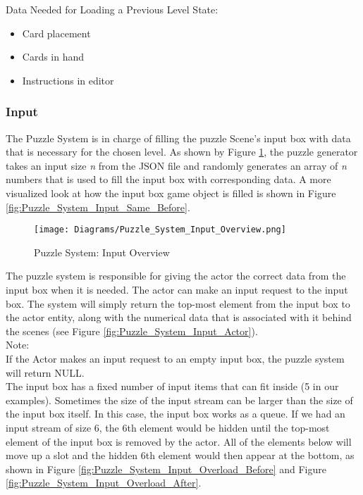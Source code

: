 Data Needed for Loading a Previous Level State:
\begin{itemize}
  \item Card placement
  \item Cards in hand
  \item Instructions in editor
\end{itemize}

\subsubsection{Input}
The Puzzle System is in charge of filling the puzzle Scene's input box with data
that is necessary for the chosen level. As shown by Figure \ref{fig:Puzzle_System_Input_Overview}, 
the puzzle generator takes an input size \textit{n} from the JSON file and randomly generates an array of 
\textit{n} numbers that is used to fill the input box with corresponding data. A more visualized
look at how the input box game object is filled is shown in Figure \ref{fig:Puzzle_System_Input_Same_Before}.\\

\begin{figure}[!hb]
  \caption{Puzzle System: Input Overview}
  \label{fig:Puzzle_System_Input_Overview}
  \centering
  \texttt{[image: Diagrams/Puzzle\_System\_Input\_Overview.png]}
\end{figure}

The puzzle system is responsible for giving the actor the correct data from the
input box when it is needed. The actor can make an input request to the input box.
The system will simply return the top-most element from the input box to the actor entity, along with the
numerical data that is associated with it behind the scenes (see Figure \ref{fig:Puzzle_System_Input_Actor}).\\

Note:\\

If the Actor makes an input request to an empty input box, the puzzle system
will return NULL.\\

The input box has a fixed number of input items that can fit inside (5 in our examples).
Sometimes the size of the input stream can be larger than the size of the input box
itself. In this case, the input box works as a queue. If we had an input stream of
size 6, the 6th element would be hidden until the top-most element of the input box
is removed by the actor. All of the elements below will move up a slot and the
hidden 6th element would then appear at the bottom, as shown in Figure \ref{fig:Puzzle_System_Input_Overload_Before} and
Figure \ref{fig:Puzzle_System_Input_Overload_After}.\\

